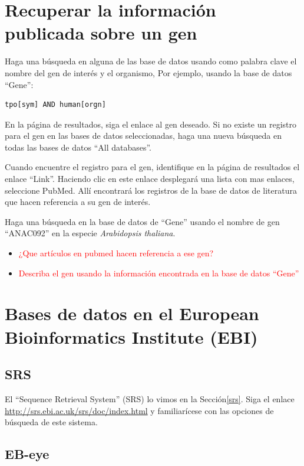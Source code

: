 \documentclass[letter,11pt]{book}
\begin{document}
\section{Recuperar la información publicada sobre un gen}

Haga una búsqueda en alguna de las base de datos usando como palabra clave el nombre del gen de interés y el organismo, Por ejemplo, usando la base de datos ``Gene'':

\begin{verbatim}
tpo[sym] AND human[orgn]
\end{verbatim}

En la página de resultados, siga el enlace al gen deseado. Si no existe un registro para el gen en las bases de datos seleccionadas, haga una nueva búsqueda en todas las bases de datos ``All databases''.

Cuando encuentre el registro para el gen, identifique en la página de resultados el enlace  ``Link''. Haciendo clic en este enlace desplegará una lista con mas enlaces, seleccione PubMed. Allí encontrará los registros de la base de datos de literatura que hacen referencia a su gen de interés.

Haga una búsqueda en la base de datos de ``Gene'' usando el nombre de gen ``ANAC092'' en la especie \textit{Arabidopsis thaliana}.


\begin{itemize}
\item \textcolor{red}{¿Que artículos en pubmed hacen referencia a ese gen?}
\item \textcolor{red}{Describa el gen usando la información encontrada en la base de datos ``Gene''}
\end{itemize}

\section{Bases de datos en el European Bioinformatics Institute (EBI)}

\subsection{SRS}

El ``Sequence Retrieval System'' (SRS) lo vimos en la Sección\ref{srs}. Siga el enlace \url{http://srs.ebi.ac.uk/srs/doc/index.html} y familiarícese con las opciones de búsqueda de este sistema.

\subsection{EB-eye}
\end{document}
